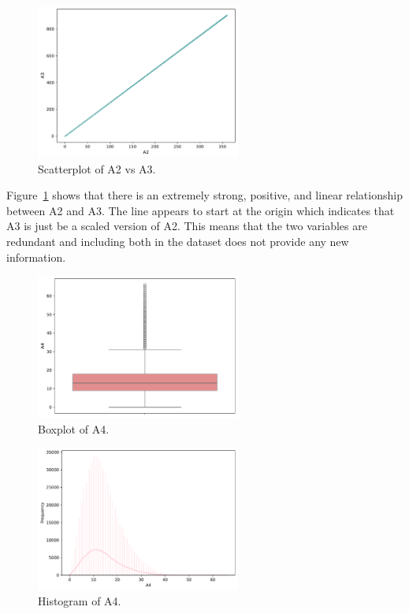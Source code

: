 \documentclass[11pt]{report}
\begin{document}
\begin{figure}[H]
    \centering
    \includegraphics[width=0.6\textwidth]{images/A2_vs_A3_scatterplot.pdf}
    \caption{Scatterplot of A2 vs A3.}
    \label{fig:A2_vs_A3_scatterplot}
\end{figure}

Figure~\ref{fig:A2_vs_A3_scatterplot} shows that there is an extremely strong, positive, and linear relationship between A2 and A3. The line appears to start at the origin which indicates that A3 is just be a scaled version of A2. This means that the two variables are redundant and including both in the dataset does not provide any new information.

\begin{figure}[H]
    \centering
    \includegraphics[width=0.6\textwidth]{images/A4_boxplot.pdf}
    \caption{Boxplot of A4.}
    \label{fig:a4_boxplot}
\end{figure}

\begin{figure}[H]
    \centering
    \includegraphics[width=0.6\textwidth]{images/A4_histplot.pdf}
    \caption{Histogram of A4.}
    \label{fig:a4_histplot}
\end{figure}
\end{document}
